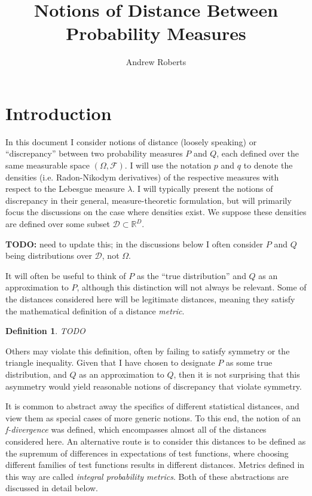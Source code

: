 \documentclass[12pt]{article}
\title{Notions of Distance Between Probability Measures}
\author{Andrew Roberts}
\newcommand{\R}{\mathbb{R}}
\newtheorem{definition}{Definition}
\begin{document}
\maketitle
\tableofcontents
\newpage

\section{Introduction}
In this document I consider notions of distance (loosely speaking) or ``discrepancy'' between two probability measures $P$ and $Q$, each defined over the same measurable space $(\Omega, \mathcal{F})$. I will use the notation 
$p$ and $q$ to denote the densities (i.e. Radon-Nikodym derivatives) of the respective measures with respect to the Lebesgue measure $\lambda$. I will typically present the notions of discrepancy in their general, 
measure-theoretic formulation, but will primarily focus the discussions on the case where densities exist. We suppose these densities are defined over some subset $\mathcal{D} \subset \R^D$. 

\textbf{TODO:} need to update this; in the discussions below I often consider $P$ and $Q$ being distributions over $\mathcal{D}$, not $\Omega$. 

It will often be useful to think of $P$ as the ``true distribution'' and $Q$ as an 
approximation to $P$, although this distinction will not always be relevant. Some of the distances considered here will be legitimate distances, meaning they satisfy the mathematical definition of a distance \textit{metric}. 
\begin{definition}
TODO
\end{definition}
Others may violate this definition, often by failing to satisfy symmetry or the triangle inequality. Given that I have chosen to designate $P$ as some true distribution, and $Q$ as an approximation to $Q$, then it is not surprising 
that this asymmetry would yield reasonable notions of discrepancy that violate symmetry. 

It is common to abstract away the specifics of different statistical distances, and view them as special cases of more generic notions. To this end, the notion of an \textit{f-divergence} was defined, which encompasses almost 
all of the distances considered here. An alternative route is to consider this distances to be defined as the supremum of differences in expectations of test functions, where choosing different families of test functions results 
in different distances. Metrics defined in this way are called \textit{integral probability metrics}. Both of these abstractions are discussed in detail below. 
\end{document}

